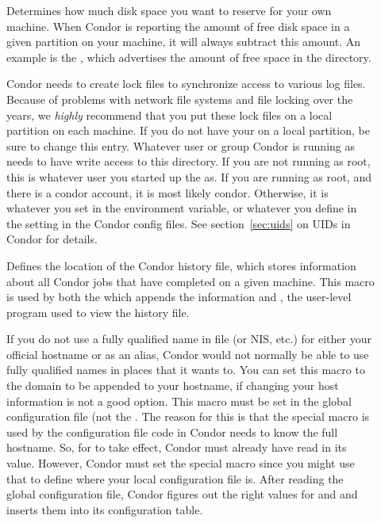 \begin{description}
\item[] \label{param:ReservedDisk} Determines
  how much disk space you want to reserve for your own
  machine.  When Condor is reporting the amount of free disk space in
  a given partition on your machine, it will always subtract this
  amount.  An example is the , which
  advertises the amount of
  free space in the  directory.
  
\item[] \label{param:Lock} Condor needs to create
  lock files to synchronize access to various log files.  Because of
  problems with network file systems and file locking over
  the years, we \emph{highly} recommend that you put these lock
  files on a local partition on each machine.  If you do not have your
   on a local partition, be sure to change this
  entry.  Whatever user or group Condor is running as needs to have
  write access to this directory.  If you are not running as root, this
  is whatever user you started up the  as.  If you are
  running as root, and there is a condor account, it is most
  likely condor.
  Otherwise, it is whatever you set in the 
  environment variable, or whatever you define in the
   setting in the Condor config files.
  See section~\ref{sec:uids} on UIDs in Condor for details.

\item[] \label{param:History} Defines the
  location of the Condor history file, which stores information about
  all Condor jobs that have completed on a given machine.  This macro
  is used by both the  which appends the information
  and , the user-level program used to view
  the history file.

\item[] \label{param:DefaultDomainName}
  If you do not use a fully qualified name in file 
  (or NIS, etc.) for either your official hostname or as an
  alias, Condor would not normally be able to use fully qualified names
  in places that it wants to.  You can set this macro to the
  domain to be appended to your hostname, if changing your host
  information is not a good option.  This macro must be set in the
  global configuration file (not the .
  The reason for this is that the special 
  macro is used by the configuration file code in Condor needs
  to know the full hostname.  So, for  to
  take effect, Condor must already have read in its value.  However,
  Condor must set the  special macro since you
  might use that to define where your local configuration file is.  After
  reading the global configuration file, Condor figures out the right values
  for  and  and inserts them
  into its configuration table.


\end{description}
